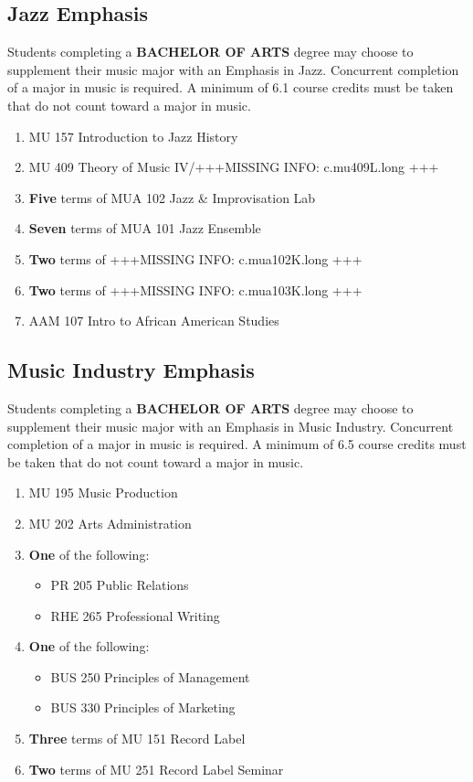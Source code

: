 \documentclass[
  letterpaper,
]{scrbook}
\providecommand{\tightlist}{%
  \setlength{\itemsep}{0pt}\setlength{\parskip}{0pt}}
\begin{document}
\subsection{Jazz Emphasis}\label{jazz-emphasis}

Students completing a \textbf{BACHELOR OF ARTS} degree may choose to
supplement their music major with an Emphasis in Jazz. Concurrent
completion of a major in music is required. A minimum of 6.1 course
credits must be taken that do not count toward a major in music.

\begin{enumerate}
\def\labelenumi{\arabic{enumi}.}
\tightlist
\item
  MU 157 Introduction to Jazz History
\item
  MU 409 Theory of Music IV/+++MISSING INFO: c.mu409L.long +++
\item
  \textbf{Five} terms of MUA 102 Jazz \& Improvisation Lab
\item
  \textbf{Seven} terms of MUA 101 Jazz Ensemble
\item
  \textbf{Two} terms of +++MISSING INFO: c.mua102K.long +++
\item
  \textbf{Two} terms of +++MISSING INFO: c.mua103K.long +++
\item
  AAM 107 Intro to African American Studies
\end{enumerate}

\subsection{Music Industry Emphasis}\label{music-industry-emphasis}

Students completing a \textbf{BACHELOR OF ARTS} degree may choose to
supplement their music major with an Emphasis in Music Industry.
Concurrent completion of a major in music is required. A minimum of 6.5
course credits must be taken that do not count toward a major in music.

\begin{enumerate}
\def\labelenumi{\arabic{enumi}.}
\tightlist
\item
  MU 195 Music Production
\item
  MU 202 Arts Administration
\item
  \textbf{One} of the following:

  \begin{itemize}
  \tightlist
  \item
    PR 205 Public Relations
  \item
    RHE 265 Professional Writing
  \end{itemize}
\item
  \textbf{One} of the following:

  \begin{itemize}
  \tightlist
  \item
    BUS 250 Principles of Management
  \item
    BUS 330 Principles of Marketing
  \end{itemize}
\item
  \textbf{Three} terms of MU 151 Record Label
\item
  \textbf{Two} terms of MU 251 Record Label Seminar
\end{enumerate}
\end{document}
